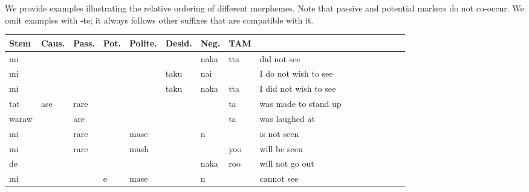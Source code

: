 \documentclass[11pt,letterpaper]{article}
\begin{document}




We provide examples illustrating the relative ordering of different morphemes.
Note that passive and potential markers do not co-occur.
We omit examples with -te; it always follows other suffixes that are compatible with it.



\begin{tabular}{lllllllll|lllllll}
Stem & Caus. & Pass. & Pot. & Polite. & Desid. & Neg. & TAM & \\ \hline
mi &          &      & &            &          & naka     & tta    & did not see \cite[153]{vaccari1938complete}\\
mi &          &      & &            & taku     & nai      &         & I do not wish to see \cite[98]{vaccari1938complete} \\
mi &          &      & &            & taku     & naka    & tta       & I did not wish to see \cite[98]{vaccari1938complete} \\
tat & ase     & rare & &            &          &         & ta         & was made to stand up \cite[396]{kaiser2013japanese} \\
waraw  &       & are & &            &           &         & ta        & was laughed at \cite[384]{kaiser2013japanese} \\
mi     &       & rare& & mase       &          & n        &           & is not seen \cite[337]{vaccari1938complete} \\
mi     &       & rare& & mash      &           &          & yoo      & will be seen \cite[337]{vaccari1938complete} \\
de     &       &    & &            &           & naka     & roo      & will not go out \cite[170]{vaccari1938complete} \\
mi     &       &    & e & mase       &           & n        &          & cannot see \cite[349]{vaccari1938complete} \\
\end{tabular}
\end{document}
